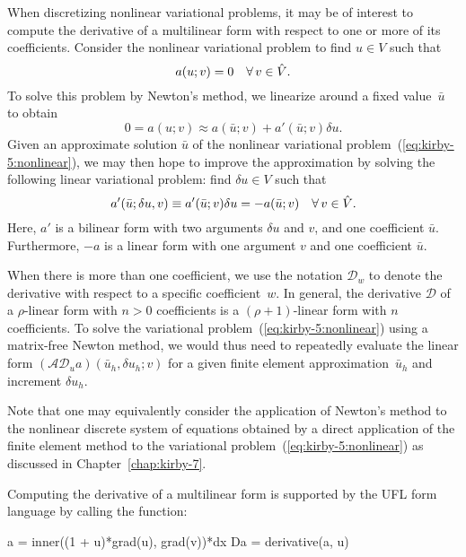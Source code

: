 When discretizing nonlinear variational problems, it may be of
interest to compute the derivative of a multilinear form with respect
to one or more of its coefficients. Consider the nonlinear variational
problem to find $u \in V$ such that
\begin{equation} \label{eq:kirby-5:nonlinear}
  a(u; v) = 0 \quad \forall\, v \in \hat{V}.
\end{equation}
To solve this problem by Newton's method, we linearize around a fixed
value~$\bar{u}$ to obtain
\begin{equation}
  0 = a(u; v) \approx a(\bar{u}; v) + a'(\bar{u}; v) \delta u.
\end{equation}
Given an approximate solution $\bar{u}$ of the nonlinear variational
problem~(\ref{eq:kirby-5:nonlinear}), we may then hope to improve the
approximation by solving the following linear variational problem:
find $\delta u \in V$ such that
\begin{equation}
  a'(\bar{u}; \delta u, v) \equiv a'(\bar{u}; v) \delta u = -a(\bar{u}; v)
  \quad \forall\, v \in \hat{V}.
\end{equation}
Here, $a'$ is a bilinear form with two arguments $\delta u$ and $v$,
and one coefficient $\bar{u}$. Furthermore, $-a$ is a linear form with one
argument $v$ and one coefficient $\bar{u}$.

When there is more than one coefficient, we use the notation
$\mathcal{D}_w$ to denote the derivative with respect to a specific
coefficient~$w$. In general, the derivative $\mathcal{D}$ of a
$\rho$-linear form with $n > 0$ coefficients is a $(\rho+1)$-linear
form with $n$ coefficients. To solve the variational
problem~(\ref{eq:kirby-5:nonlinear}) using a matrix-free Newton
method, we would thus need to repeatedly evaluate the linear form
$(\mathcal{A}\mathcal{D}_u a) (\bar{u}_h, \delta u_h; v)$ for a given
finite element approximation~$\bar{u}_h$ and increment $\delta u_h$.

Note that one may equivalently consider the application of Newton's
method to the nonlinear discrete system of equations obtained by a
direct application of the finite element method to the variational
problem~(\ref{eq:kirby-5:nonlinear}) as discussed in
Chapter~\ref{chap:kirby-7}.

Computing the derivative of a multilinear form is supported by the UFL
form language by calling the  function:
\begin{python}
a  = inner((1 + u)*grad(u), grad(v))*dx
Da = derivative(a, u)
\end{python}

